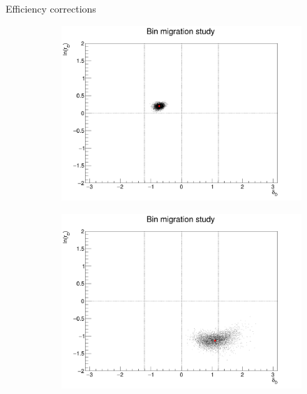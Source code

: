 \documentclass{beamer}
\begin{document}
\begin{frame}{Efficiency corrections}
\begin{figure}
\begin{subfigure}{0.38\textwidth}
      \includegraphics[width=\textwidth]{Plots/BinMigration_Point4.png}
    \end{subfigure}%
    \begin{subfigure}{0.38\textwidth}
      \centering
      \includegraphics[width=\textwidth]{Plots/BinMigration_Point6.png}
    \end{subfigure}
  \end{figure}
\end{frame}
\end{document}
